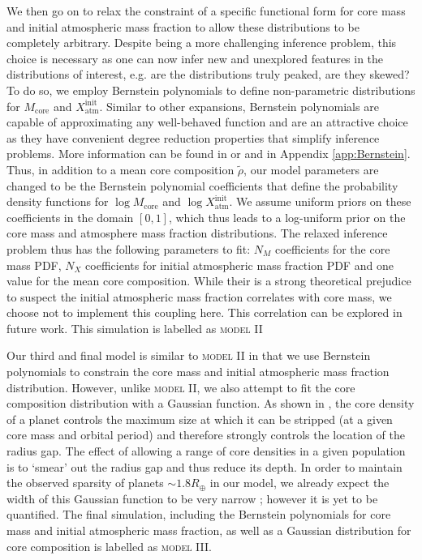 \documentclass[fleqn,usenatbib]{mnras}
\begin{document}
We then go on to relax the constraint of a specific functional form for core mass and initial atmospheric mass fraction to allow these distributions to be completely arbitrary. Despite being a more challenging inference problem, this choice is necessary as one can now infer new and unexplored features in the distributions of interest, e.g. are the distributions truly peaked, are they skewed? To do so, we employ Bernstein polynomials to define non-parametric distributions for $M_\text{core}$ and $X_\text{atm}^\text{init}$. Similar to other expansions, Bernstein polynomials are capable of approximating any well-behaved function and are an attractive choice as they have convenient degree reduction properties that simplify inference problems. More information can be found in \cite{Farouki2012} or \cite{Bo2018} and in Appendix \ref{app:Bernstein}. Thus, in addition to a mean core composition $\tilde{\rho}$, our model parameters are changed to be the Bernstein polynomial coefficients that define the probability density functions for $\log M_{\text{core}}$ and $\log X_\text{atm}^\text{init}$. We assume uniform priors on these coefficients in the domain $[0,1]$, which thus leads to a log-uniform prior on the core mass and atmosphere mass fraction distributions. The relaxed inference problem thus has the following parameters to fit: $N_M$ coefficients for the core mass PDF, $N_X$ coefficients for initial atmospheric mass fraction PDF and one value for the mean core composition. While their is a strong theoretical prejudice to suspect the initial atmospheric mass fraction correlates with core mass, we choose not to implement this coupling here. This correlation can be explored in future work. This simulation is labelled as \textsc{model II}

Our third and final model is similar to \textsc{model II} in that we use Bernstein polynomials to constrain the core mass and initial atmospheric mass fraction distribution. However, unlike \textsc{model II}, we also attempt to fit the core composition distribution with a Gaussian function. As shown in \cite{Owen2017}, the core density of a planet controls the maximum size at which it can be stripped (at a given core mass and orbital period) and therefore strongly controls the location of the radius gap. The effect of allowing a range of core densities in a given population is to `smear' out the radius gap and thus reduce its depth. In order to maintain the observed sparsity of planets $\sim 1.8R_\oplus$ in our model, we already expect the width of this Gaussian function to be very narrow \citep{Owen2017,VanEylen2018}; however it is yet to be quantified. The final simulation, including the Bernstein polynomials for core mass and initial atmospheric mass fraction, as well as a Gaussian distribution for core composition is labelled as \textsc{model III}.
\end{document}
